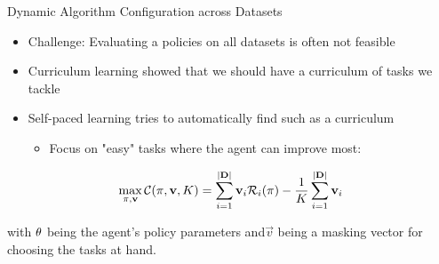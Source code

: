 \begin{frame}[c]{Dynamic Algorithm Configuration across Datasets }
	
\begin{itemize}
	\item Challenge: Evaluating a policies on all datasets is often not feasible
	\pause
	\item Curriculum learning  showed that we should have a curriculum of tasks we tackle
	\pause
	\item Self-paced learning  tries to automatically find such as a curriculum
	\begin{itemize}
		\item Focus on "easy" tasks where the agent can improve most:
	\end{itemize}
\end{itemize}
	
\pause
\begin{equation} 
\label{spl_loss}
\max_{\pi,\mathbf{v}}\mathcal{C}(\pi, \mathbf{v}, K) = \sum^{|\mathbf{D}|}_{i=1} \mathbf{v}_i\mathcal{R}_i(\pi) - \frac{1}{K} \sum^{|\mathbf{D}|}_{i=1} \mathbf{v}_i \nonumber
\end{equation}

with $\theta$ being the agent's policy parameters and\newline $\vec{v}$ being a masking vector for choosing the tasks at hand.

%
\end{frame}


